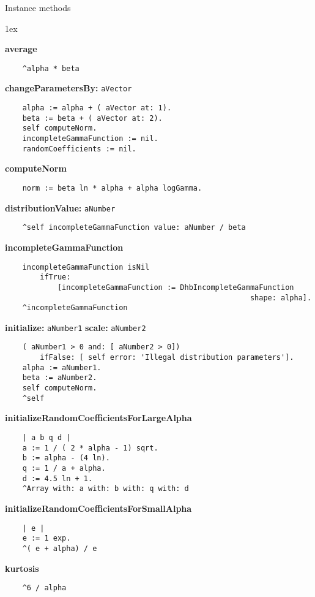 Instance methods
{\parskip 1ex\par\noindent}
{\bf average}
\begin{verbatim}
    ^alpha * beta

\end{verbatim}
{\bf changeParametersBy:} {\tt aVector}
\begin{verbatim}
    alpha := alpha + ( aVector at: 1).
    beta := beta + ( aVector at: 2).
    self computeNorm.
    incompleteGammaFunction := nil.
    randomCoefficients := nil.

\end{verbatim}
{\bf computeNorm}
\begin{verbatim}
    norm := beta ln * alpha + alpha logGamma.

\end{verbatim}
{\bf distributionValue:} {\tt aNumber}
\begin{verbatim}
    ^self incompleteGammaFunction value: aNumber / beta

\end{verbatim}
{\bf incompleteGammaFunction}
\begin{verbatim}
    incompleteGammaFunction isNil 
        ifTrue: 
            [incompleteGammaFunction := DhbIncompleteGammaFunction 
                                                        shape: alpha].
    ^incompleteGammaFunction

\end{verbatim}
{\bf initialize:} {\tt aNumber1} {\bf scale:} {\tt aNumber2}
\begin{verbatim}
    ( aNumber1 > 0 and: [ aNumber2 > 0])
        ifFalse: [ self error: 'Illegal distribution parameters'].
    alpha := aNumber1.
    beta := aNumber2.
    self computeNorm.
    ^self

\end{verbatim}
{\bf initializeRandomCoefficientsForLargeAlpha}
\begin{verbatim}
    | a b q d |
    a := 1 / ( 2 * alpha - 1) sqrt.
    b := alpha - (4 ln).
    q := 1 / a + alpha.
    d := 4.5 ln + 1.
    ^Array with: a with: b with: q with: d

\end{verbatim}
{\bf initializeRandomCoefficientsForSmallAlpha}
\begin{verbatim}
    | e |
    e := 1 exp.
    ^( e + alpha) / e

\end{verbatim}
{\bf kurtosis}
\begin{verbatim}
    ^6 / alpha

\end{verbatim}
